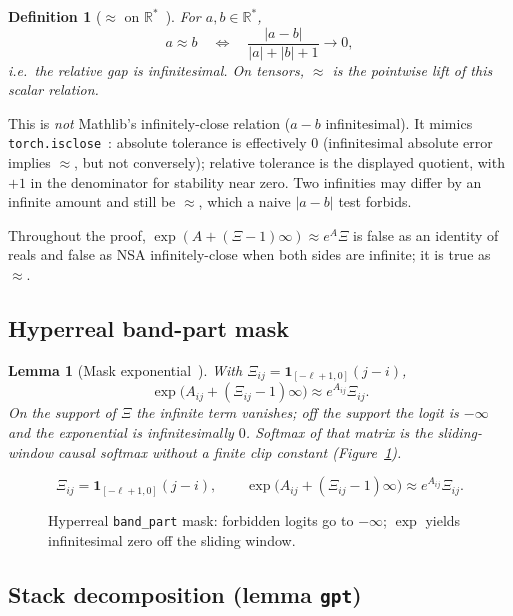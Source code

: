 \documentclass[11pt,a4paper]{article}
\newtheorem{lemma}[theorem]{Lemma}
\newtheorem{definition}[theorem]{Definition}
\newcommand{\XEq}{\approx}
\newcommand{\Rstar}{\mathbb{R}^*}
\begin{document}
\begin{definition}[\texorpdfstring{$\XEq$}{approx} on \texorpdfstring{$\Rstar$}{R*}~\cite{lemma_xeq}]
\label{def:xeq}
For $a,b\in\Rstar$,
\[
a\XEq b
\quad\Longleftrightarrow\quad
\frac{|a-b|}{|a|+|b|+1}\to 0,
\]
i.e.\ the relative gap is infinitesimal.
On tensors, $\XEq$ is the pointwise lift of this scalar relation.
\end{definition}

This is \emph{not} Mathlib's infinitely-close relation ($a-b$ infinitesimal).
It mimics \texttt{torch.isclose}~\cite{pytorch_isclose}:
absolute tolerance is effectively $0$ (infinitesimal absolute error implies $\XEq$, but not conversely);
relative tolerance is the displayed quotient, with $+1$ in the denominator for stability near zero.
Two infinities may differ by an infinite amount and still be $\XEq$, which a naive $|a-b|$ test forbids.

Throughout the proof, $\exp(A+(\Xi-1)\infty)\XEq e^{A}\Xi$ is false as an identity of reals and false as NSA infinitely-close when both sides are infinite; it is true as $\XEq$.

\subsection{Hyperreal band-part mask}

\begin{lemma}[Mask exponential~\cite{lemma_gpt}]
\label{lem:mask}
With $\Xi_{ij}=\mathbf{1}_{[-\ell+1,0]}(j-i)$,
\[
\exp\bigl(A_{ij}+(\Xi_{ij}-1)\infty\bigr)\XEq e^{A_{ij}}\Xi_{ij}.
\]
On the support of $\Xi$ the infinite term vanishes; off the support the logit is $-\infty$ and the exponential is infinitesimally $0$.
Softmax of that matrix is the sliding-window causal softmax without a finite clip constant (Figure~\ref{fig:mask}).
\end{lemma}

\begin{figure}[ht]
\centering
\[
\Xi_{ij}=\mathbf{1}_{[-\ell+1,0]}(j-i),\qquad
\exp\bigl(A_{ij}+(\Xi_{ij}-1)\infty\bigr)\XEq e^{A_{ij}}\Xi_{ij}.
\]
\caption{Hyperreal \texttt{band\_part} mask: forbidden logits go to $-\infty$; $\exp$ yields infinitesimal zero off the sliding window.}
\label{fig:mask}
\end{figure}

\subsection{Stack decomposition (lemma \texttt{gpt})}
\end{document}
